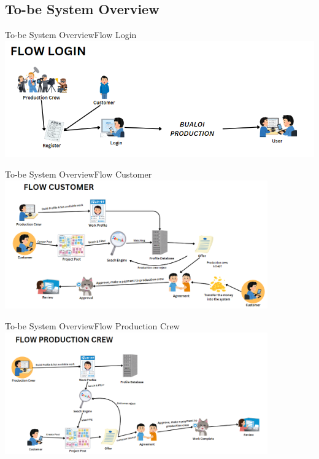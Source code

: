 \documentclass[aspectratio=169]{beamer}
\begin{document}
\subsection{To-be System Overview}
\begin{frame}{To-be System Overview}{Flow Login}
    \centering
    \includegraphics[width=\textwidth]{flowlogin.png}


\end{frame}

\begin{frame}{To-be System Overview}{Flow Customer}
    \centering
    \includegraphics[width=0.85\textwidth]{flowcustomer.png}
\end{frame}
\begin{frame}{To-be System Overview}{Flow Production Crew}
    \centering
    \includegraphics[width=0.85\textwidth]{flowerproductioncrew.png}
\end{frame}
\end{document}
